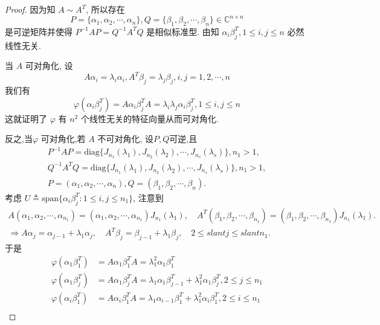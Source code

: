 \documentclass[../../main.tex]{subfiles}
\begin{document}
\begin{proof}
因为知 $A \sim A^T$, 所以存在
$$P = \{\alpha_1, \alpha_2, \cdots, \alpha_n\}, Q = \{\beta_1, \beta_2, \cdots, \beta_n\} \in \mathbb{C}^{n \times n}$$
是可逆矩阵并使得 $P^{-1}AP = Q^{-1}A^TQ$ 是相似标准型. 由知 $\alpha_i \beta_j^T, 1 \leqslant  i, j \leqslant  n$ 必然线性无关.

当 $A$ 可对角化, 设
$$A\alpha_i = \lambda_i \alpha_i, A^T \beta_j = \lambda_j \beta_j, i, j = 1, 2, \cdots, n$$
我们有
$$\varphi(\alpha_i \beta_j^T) = A\alpha_i \beta_j^T A = \lambda_i \lambda_j \alpha_i \beta_j^T, 1 \leqslant  i, j \leqslant  n$$
这就证明了 $\varphi$ 有 $n^2$ 个线性无关的特征向量从而可对角化.

反之,当$\varphi$ 可对角化,若 $A$ 不可对角化, 设$P,Q$可逆,且
\begin{gather*}
P^{-1}AP=\mathrm{diag}\{J_{n_1}(\lambda _1),J_{n_2}(\lambda _2),\cdots ,J_{n_s}(\lambda _s)\},n_1>1,
\\
Q^{-1}A^TQ=\mathrm{diag}\{J_{n_1}(\lambda _1),J_{n_2}(\lambda _2),\cdots ,J_{n_s}(\lambda _s)\},n_1>1,
\\
P=\left( \alpha _1,\alpha _2,\cdots ,\alpha _n \right) ,Q=\left( \beta _1,\beta _2,\cdots ,\beta _n \right) .
\end{gather*}
考虑 $U \triangleq \mathrm{span}\{\alpha_i \beta_j^T : 1 \leqslant  i, j \leqslant  n_1\}$, 注意到
\begin{gather*}
A\left( \alpha _1,\alpha _2,\cdots ,\alpha _{n_1} \right) =\left( \alpha _1,\alpha _2,\cdots ,\alpha _{n_1} \right) J_{n_1}\left( \lambda _1 \right) ,\quad A^T\left( \beta _1,\beta _2,\cdots ,\beta _{n_1} \right) =\left( \beta _1,\beta _2,\cdots ,\beta _{n_1} \right) J_{n_1}\left( \lambda _1 \right) .
\\
\Rightarrow A\alpha _j=\alpha _{j-1}+\lambda _1\alpha _j,\quad A^T\beta _j=\beta _{j-1}+\lambda _1\beta _j,\quad 2\leqslant slant j\leqslant slant n_1.
\end{gather*}
于是
\begin{align*}
\varphi(\alpha_1 \beta_1^T) &= A\alpha_1 \beta_1^T A = \lambda_1^2 \alpha_1 \beta_1^T \\
\varphi(\alpha_1 \beta_j^T) &= A\alpha_1 \beta_j^T A = \lambda_1 \alpha_1 \beta_{j - 1}^T + \lambda_1^2 \alpha_1 \beta_j^T, 2 \leqslant  j \leqslant  n_1 \\
\varphi(\alpha_i \beta_1^T) &= A\alpha_i \beta_1^T A = \lambda_1 \alpha_{i - 1} \beta_1^T + \lambda_1^2 \alpha_i \beta_1^T, 2 \leqslant  i \leqslant  n_1 \\

\end{align*}
\end{proof}
\end{document}
